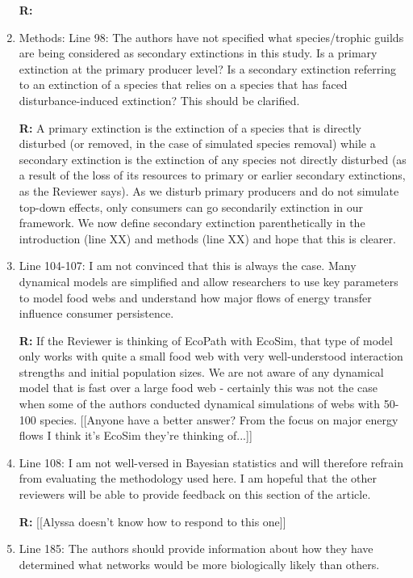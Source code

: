 \documentclass[12pt]{article}
\begin{document}
\begin{enumerate}
                \textbf{R:}


            \item Methods: Line 98: The authors have not specified what species/trophic guilds are being considered as secondary extinctions in this study. Is a primary extinction at the primary producer level? Is a secondary extinction referring to an extinction of a species that relies on a species that has faced disturbance-induced extinction? This should be clarified.

                \textbf{R:} A primary extinction is the extinction of a species that is directly disturbed (or removed, in the case of simulated species removal) while a secondary extinction is the extinction of any species not directly disturbed (as a result of the loss of its resources to primary or earlier secondary extinctions, as the Reviewer says). As we disturb primary producers and do not simulate top-down effects, only consumers can go secondarily extinction in our framework. We now define secondary extinction parenthetically in the introduction (line XX) and methods (line XX) and hope that this is clearer. 


            \item Line 104-107: I am not convinced that this is always the case. Many dynamical models are simplified and allow researchers to use key parameters to model food webs and understand how major flows of energy transfer influence consumer persistence.

                \textbf{R:} If the Reviewer is thinking of EcoPath with EcoSim, that type of model only works with quite a small food web with very well-understood interaction strengths and initial population sizes. We are not aware of any dynamical model that is fast over a large food web - certainly this was not the case when some of the authors conducted dynamical simulations of webs with 50-100 species. [[Anyone have a better answer? From the focus on major energy flows I think it's EcoSim they're thinking of...]]


            \item Line 108: I am not well-versed in Bayesian statistics and will therefore refrain from evaluating the methodology used here. I am hopeful that the other reviewers will be able to provide feedback on this section of the article.

                \textbf{R:} [[Alyssa doesn't know how to respond to this one]]


            \item Line 185: The authors should provide information about how they have determined what networks would be more biologically likely than others.


\end{enumerate}
\end{document}
